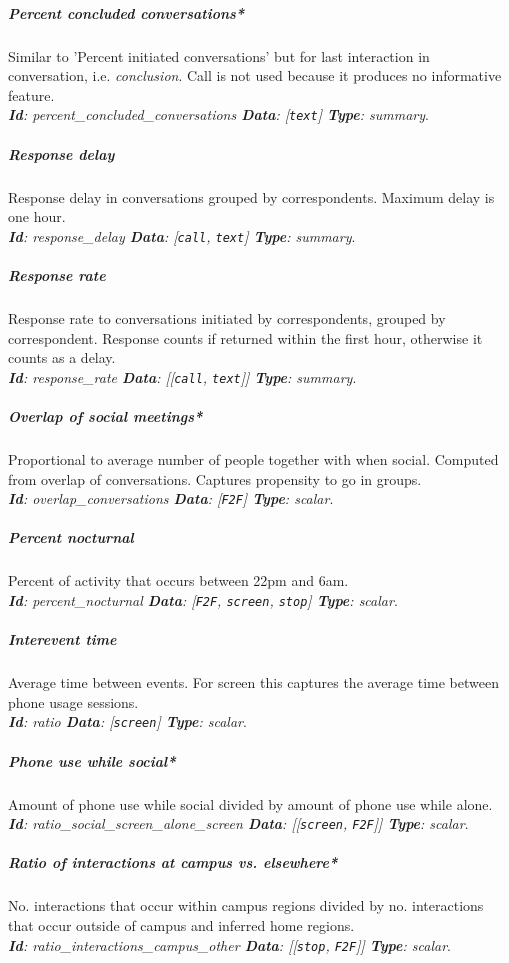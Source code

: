 \subparagraph*{Percent concluded conversations*}
Similar to 'Percent initiated conversations' but for last interaction in conversation, i.e. \textit{conclusion}. Call is not used because it produces no informative feature.\\ \textit{\textbf{Id}: percent\_concluded\_conversations \textbf{Data}: [\texttt{\footnotesize text}] \textbf{Type}: summary}.

\subparagraph*{Response delay}
Response delay in conversations grouped by correspondents. Maximum delay is one hour.\\ \textit{\textbf{Id}: response\_delay \textbf{Data}: [\texttt{\footnotesize call}, \texttt{\footnotesize text}] \textbf{Type}: summary}.

\subparagraph*{Response rate}
Response rate to conversations initiated by correspondents, grouped by correspondent. Response counts if returned within the first hour, otherwise it counts as a delay.\\ \textit{\textbf{Id}: response\_rate \textbf{Data}: [[\texttt{\footnotesize call}, \texttt{\footnotesize text}]] \textbf{Type}: summary}.

\subparagraph*{Overlap of social meetings*}
Proportional to average number of people together with when social. Computed from overlap of conversations. Captures propensity to go in groups.\\ \textit{\textbf{Id}: overlap\_conversations \textbf{Data}: [\texttt{\footnotesize F2F}] \textbf{Type}: scalar}.

\subparagraph*{Percent nocturnal}
Percent of activity that occurs between 22pm and 6am.\\ \textit{\textbf{Id}: percent\_nocturnal \textbf{Data}: [\texttt{\footnotesize F2F}, \texttt{\footnotesize screen}, \texttt{\footnotesize stop}] \textbf{Type}: scalar}.

\subparagraph*{Interevent time}
Average time between events. For screen this captures the average time between phone usage sessions.\\ \textit{\textbf{Id}: ratio \textbf{Data}: [\texttt{\footnotesize screen}] \textbf{Type}: scalar}.

\subparagraph*{Phone use while social*}
Amount of phone use while social divided by amount of phone use while alone.\\ \textit{\textbf{Id}: ratio\_social\_screen\_alone\_screen \textbf{Data}: [[\texttt{\footnotesize screen}, \texttt{\footnotesize F2F}]] \textbf{Type}: scalar}.

\subparagraph*{Ratio of interactions at campus vs. elsewhere*}
No. interactions that occur within campus regions divided by no. interactions that occur outside of campus and inferred home regions.\\ \textit{\textbf{Id}: ratio\_interactions\_campus\_other \textbf{Data}: [[\texttt{\footnotesize stop}, \texttt{\footnotesize F2F}]] \textbf{Type}: scalar}.

